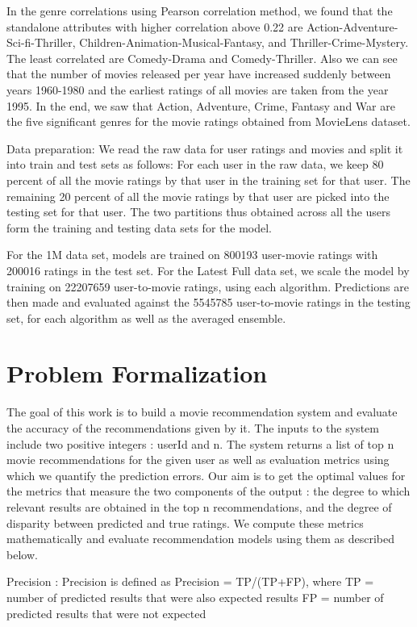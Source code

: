 \documentclass[sigconf]{acmart}
\begin{document}
In the genre correlations using Pearson correlation method, we found that the standalone attributes with higher correlation above 0.22 are Action-Adventure-Sci-fi-Thriller, Children-Animation-Musical-Fantasy, and Thriller-Crime-Mystery. The least correlated are Comedy-Drama and Comedy-Thriller. Also we can see that the number of movies released per year have increased suddenly between years 1960-1980 and the earliest ratings of all movies are taken from the year 1995. In the end, we saw that Action, Adventure, Crime, Fantasy and War are the five significant genres for the movie ratings obtained from MovieLens dataset.

Data preparation:
We read the raw data for user ratings and movies and split it into train and test sets as follows:
For each user in the raw data, we keep 80 percent of all the movie ratings by that user in the training set for that user. The remaining 20 percent of all the movie ratings by that user are picked into the testing set for that user. The two partitions thus obtained across all the users form the training and testing data sets for the model.

For the 1M data set, models are trained on 800193 user-movie ratings with 200016 ratings in the test set. For the Latest Full data set, we scale the model by training on 22207659 user-to-movie ratings, using each algorithm. Predictions are then made and evaluated against the 5545785 user-to-movie ratings in the testing set, for each algorithm as well as the averaged ensemble.


\section{Problem Formalization}\label{sec:formal}
The goal of this work is to build a movie recommendation system and evaluate the accuracy of the recommendations given by it. The inputs to the system include two positive integers : userId and n. The system returns a list of top n movie recommendations for the given user as well as evaluation metrics using which we quantify the prediction errors. Our aim is to get the optimal values for the metrics that measure the two components of the output : the degree to which relevant results are obtained in the top n recommendations, and the degree of disparity between predicted and true ratings. We compute these metrics mathematically and evaluate recommendation models using them as described below.

Precision : Precision is defined as
Precision = TP/(TP+FP), where
TP = number of predicted results that were also expected results 
FP = number of predicted results that were not expected
\end{document}
